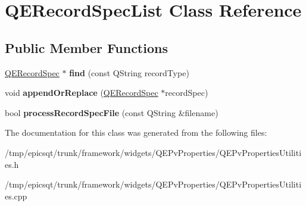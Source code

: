 \hypertarget{classQERecordSpecList}{
\section{QERecordSpecList Class Reference}
\label{classQERecordSpecList}
}
\subsection*{Public Member Functions}
\begin{DoxyCompactItemize}
\item 
\hypertarget{classQERecordSpecList_a3ef9599a641130f8f9c28442f429306c}{
\hyperlink{classQERecordSpec}{QERecordSpec} $\ast$ {\bfseries find} (const QString recordType)}
\label{classQERecordSpecList_a3ef9599a641130f8f9c28442f429306c}

\item 
\hypertarget{classQERecordSpecList_a797673b69b5c3beb1dd56dee2eb7e5b4}{
void {\bfseries appendOrReplace} (\hyperlink{classQERecordSpec}{QERecordSpec} $\ast$recordSpec)}
\label{classQERecordSpecList_a797673b69b5c3beb1dd56dee2eb7e5b4}

\item 
\hypertarget{classQERecordSpecList_acc15fa7ebba5f61aa753f27361764026}{
bool {\bfseries processRecordSpecFile} (const QString \&filename)}
\label{classQERecordSpecList_acc15fa7ebba5f61aa753f27361764026}

\end{DoxyCompactItemize}


The documentation for this class was generated from the following files:\begin{DoxyCompactItemize}
\item 
/tmp/epicsqt/trunk/framework/widgets/QEPvProperties/QEPvPropertiesUtilities.h\item 
/tmp/epicsqt/trunk/framework/widgets/QEPvProperties/QEPvPropertiesUtilities.cpp\end{DoxyCompactItemize}

